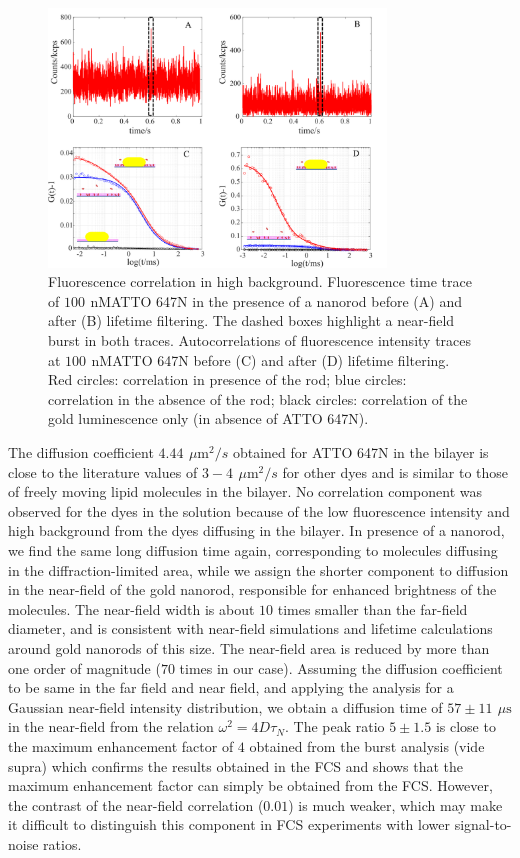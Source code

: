 \documentclass[journal=jpccck,manuscript=article]{achemso}
\newcommand{\um}{\ensuremath{\,\mu\textrm{m}}}
\newcommand{\nM}{\ensuremath{\,\textrm{nM}}}
\newcommand{\us}{\ensuremath{\,\mu\textrm{s}}}
\begin{document}
\begin{figure}
	\centering
	\includegraphics[width=0.8\textwidth]{corr_enhnc.png}
	\caption{Fluorescence correlation in high background. Fluorescence time trace of $100~$\nM ATTO 647N in the 
	presence of a nanorod before (A) and after (B) lifetime filtering. The dashed boxes highlight a near-field 
	burst in both traces. Autocorrelations of fluorescence intensity traces at $100~$\nM ATTO 647N before (C) and 
	after (D) lifetime filtering. Red circles: correlation in presence of the rod; blue circles: correlation in the 
	absence of the rod; black circles: correlation of the gold luminescence only (in absence of ATTO 647N).}
	\label{fig:corr_enhnc}
\end{figure}
The diffusion coefficient $4.44~\um^2/s$ obtained for ATTO 647N in the bilayer is close to the literature values 
of $3-4~\um^2/s$\cite{mach2010lipid} for other dyes and is similar to those of freely moving lipid molecules in the 
bilayer. No correlation component was observed for the dyes in the solution because of the low fluorescence intensity 
and high background from the dyes diffusing in the bilayer. In presence of a nanorod, we find the same long diffusion 
time again, corresponding to molecules diffusing in the diffraction-limited area, while we assign the shorter 
component to diffusion in the near-field of the gold nanorod, responsible for enhanced brightness of the molecules. 
The near-field width is about $10$ times smaller than the far-field diameter, and is consistent with near-field 
simulations and lifetime calculations around gold nanorods
of this size.\cite{khatua2014resonant,seelig2007nanoparticleinduced} The near-field area is reduced by more than 
one order of magnitude ($70$ times in our case). Assuming the diffusion coefficient to be same in the far field and 
near field, and applying the analysis for a Gaussian near-field intensity distribution, we obtain a diffusion 
time of $57\pm11~\us$ in the near-field from the relation $\omega^2=4D\tau_N$. The peak ratio $5\pm1.5$ is close to 
the maximum enhancement factor of $4$ obtained from the burst analysis (vide supra) which confirms the results 
obtained in the FCS and shows that the maximum enhancement factor can simply be obtained from the FCS. However, the 
contrast of the near-field correlation ($0.01$) is much weaker, which may make it difficult to distinguish this 
component in FCS experiments with lower signal-to-noise ratios.\\
\end{document}
